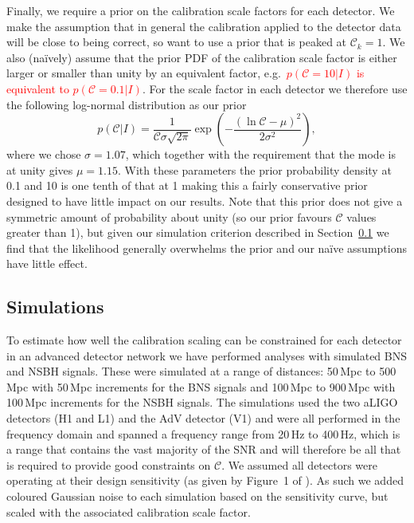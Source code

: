 \documentclass[prd, twocolumn, lengthcheck, superscriptaddress, showpacs, letterpaper, nofootinbib]{revtex4-1}
\newcommand{\scf}{\ensuremath{\mathcal{C}}}
\newcommand{\refresp}[1]{\textcolor{red}{#1}}
\begin{document}
Finally, we require a prior on the calibration scale factors for each detector.
We make the assumption that in general the calibration applied to the detector
data will be close to being correct, so want to use a prior that is peaked at $\scf_k=1$. We
also (na\"{i}vely) assume that the prior \ac{PDF} of the calibration scale factor is either
larger or smaller than unity by an equivalent factor, e.g.\ \refresp{$p(\scf=10|I)$ is
equivalent to $p(\scf=0.1|I)$}. For the scale factor in each detector we 
therefore use the following log-normal distribution as our prior
%
\begin{equation}\label{eq:scale_prior}
 p(\scf|I) = \frac{1}{\scf\sigma\sqrt{2\pi}}\exp{\left( -\frac{(\ln{\scf} - \mu)^2}{2\sigma^2} 
\right)},
\end{equation}
%
where we chose $\sigma = 1.07$, which together with the requirement that the
mode is at unity gives $\mu = 1.15$. With these parameters the prior
probability density at 0.1 and 10 is one tenth of that at 1 making this a fairly
conservative prior designed to have little impact on our results. Note that this
prior does not give a symmetric amount of probability about unity (so our prior
favours \scf\xspace values greater than 1), but given our simulation criterion
described in Section~\ref{sec:simulations} we find that the likelihood
generally overwhelms the prior and our na\"{i}ve assumptions have little effect.

\subsection{Simulations}\label{sec:simulations}

To estimate how well the calibration scaling can be constrained for each
detector in an advanced detector network we have performed analyses with simulated
\ac{BNS} and \ac{NSBH} signals. These were simulated
at a range of distances: 50\,Mpc to 500\,Mpc with 50\,Mpc increments for the
\ac{BNS} signals and 100\,Mpc to 900\,Mpc with 100\,Mpc increments for the
\ac{NSBH} signals. The simulations used the two \ac{aLIGO} detectors (H1 and
L1) and the \ac{AdV} detector (V1) and were all performed in the frequency
domain and spanned a frequency range from 20\,Hz to 400\,Hz, which is a range that contains the 
vast majority of the \ac{SNR} and will therefore be all that is required to provide good 
constraints on \scf. We assumed all
detectors were operating at their design sensitivity (as given by Figure~1 of
\cite{2013arXiv1304.0670L}). As such we added coloured Gaussian noise to each
simulation based on the sensitivity curve, but scaled with the associated
calibration scale factor.
\end{document}
